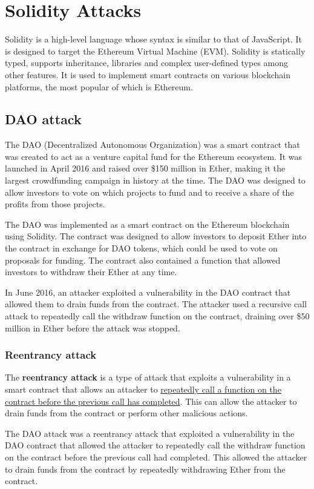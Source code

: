 \chapter{Solidity Attacks}
Solidity is a high-level language whose syntax is similar to that of JavaScript. It is designed to target the Ethereum Virtual Machine (EVM). Solidity is statically typed, supports inheritance, libraries and complex user-defined types among other features. It is used to implement smart contracts on various blockchain platforms, the most popular of which is Ethereum.

\section{DAO attack}
The DAO (Decentralized Autonomous Organization) was a smart contract that was created to act as a venture capital fund for the Ethereum ecosystem. It was launched in April 2016 and raised over \$150 million in Ether, making it the largest crowdfunding campaign in history at the time. The DAO was designed to allow investors to vote on which projects to fund and to receive a share of the profits from those projects.

The DAO was implemented as a smart contract on the Ethereum blockchain using Solidity. The contract was designed to allow investors to deposit Ether into the contract in exchange for DAO tokens, which could be used to vote on proposals for funding. The contract also contained a function that allowed investors to withdraw their Ether at any time.

In June 2016, an attacker exploited a vulnerability in the DAO contract that allowed them to drain funds from the contract. The attacker used a recursive call attack to repeatedly call the withdraw function on the contract, draining over \$50 million in Ether before the attack was stopped.

\subsection{Reentrancy attack}
The \textbf{reentrancy attack} is a type of attack that exploits a vulnerability in a smart contract that allows an attacker to \ul{repeatedly call a function on the contract before the previous call has completed}. This can allow the attacker to drain funds from the contract or perform other malicious actions.

The DAO attack was a reentrancy attack that exploited a vulnerability in the DAO contract that allowed the attacker to repeatedly call the withdraw function on the contract before the previous call had completed. This allowed the attacker to drain funds from the contract by repeatedly withdrawing Ether from the contract.

